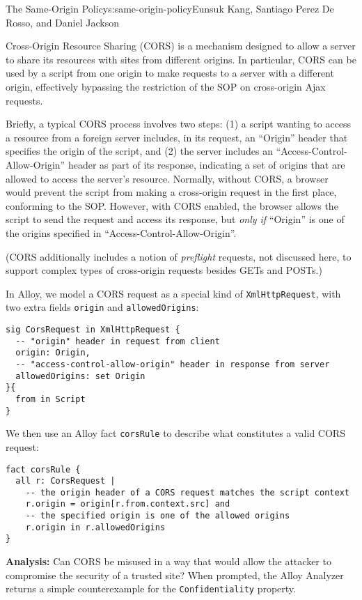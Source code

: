 \begin{aosachapter}{The Same-Origin Policy}{s:same-origin-policy}{Eunsuk Kang, Santiago Perez De Rosso, and Daniel Jackson}
\label{cross-origin-resource-sharing-cors}

Cross-Origin Resource Sharing (CORS) is a mechanism designed to allow a
server to share its resources with sites from different origins. In
particular, CORS can be used by a script from one origin to make
requests to a server with a different origin, effectively bypassing the
restriction of the SOP on cross-origin Ajax requests.

Briefly, a typical CORS process involves two steps: (1) a script wanting
to access a resource from a foreign server includes, in its request, an
``Origin'' header that specifies the origin of the script, and (2) the
server includes an ``Access-Control-Allow-Origin'' header as part of its
response, indicating a set of origins that are allowed to access the
server's resource. Normally, without CORS, a browser would prevent the
script from making a cross-origin request in the first place, conforming
to the SOP. However, with CORS enabled, the browser allows the script to
send the request and access its response, but \emph{only if} ``Origin''
is one of the origins specified in ``Access-Control-Allow-Origin''.

(CORS additionally includes a notion of \emph{preflight} requests, not
discussed here, to support complex types of cross-origin requests
besides GETs and POSTs.)

In Alloy, we model a CORS request as a special kind of
\texttt{XmlHttpRequest}, with two extra fields \texttt{origin} and
\texttt{allowedOrigins}:

\begin{verbatim}
sig CorsRequest in XmlHttpRequest {
  -- "origin" header in request from client
  origin: Origin,
  -- "access-control-allow-origin" header in response from server
  allowedOrigins: set Origin
}{
  from in Script
}
\end{verbatim}

We then use an Alloy fact \texttt{corsRule} to describe what constitutes
a valid CORS request:

\begin{verbatim}
fact corsRule {
  all r: CorsRequest |
    -- the origin header of a CORS request matches the script context
    r.origin = origin[r.from.context.src] and
    -- the specified origin is one of the allowed origins
    r.origin in r.allowedOrigins
}
\end{verbatim}

\textbf{Analysis:} Can CORS be misused in a way that would allow the
attacker to compromise the security of a trusted site? When prompted,
the Alloy Analyzer returns a simple counterexample for the
\texttt{Confidentiality} property.


\end{aosachapter}
